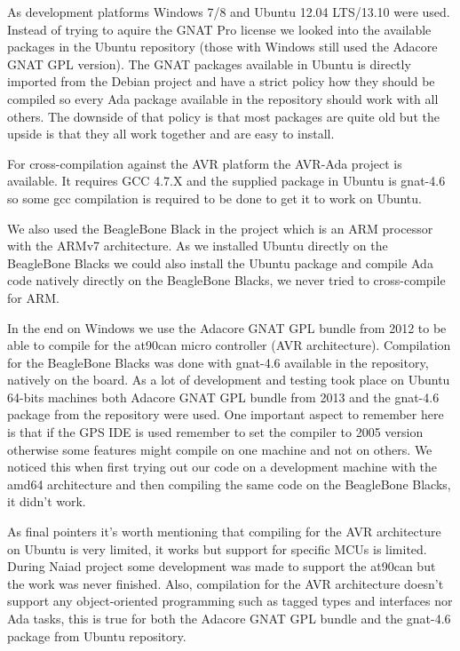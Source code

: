 As development platforms Windows 7/8 and Ubuntu 12.04 LTS/13.10 were used. Instead
of trying to aquire the GNAT Pro license we looked into the available packages
in the Ubuntu repository (those with Windows still used the Adacore GNAT GPL version).
The GNAT packages available in Ubuntu is directly imported from the Debian
project and have a strict policy \cite{web:debian_ada_policy} how they should
be compiled so every Ada package available in the repository should work with all others.
The downside of that policy is that most packages are quite old but the upside
is that they all work together and are easy to install.

For cross-compilation against the AVR platform the AVR-Ada project \cite{web:avr-ada}
is available. It requires GCC 4.7.X and the supplied package in Ubuntu is gnat-4.6 so some
gcc compilation is required to be done to get it to work on Ubuntu.

We also used the BeagleBone Black in the project which is an ARM processor with
the ARMv7 architecture. As we installed Ubuntu directly on the BeagleBone Blacks
we could also install the Ubuntu package and compile Ada code natively directly
on the BeagleBone Blacks, we never tried to cross-compile for ARM.

In the end on Windows we use the Adacore GNAT GPL bundle from 2012 to be able
to compile for the at90can micro controller (AVR architecture). Compilation for
the BeagleBone Blacks was done with gnat-4.6 available in the repository, natively
on the board. As a lot of development and testing took place on Ubuntu 64-bits
machines both Adacore GNAT GPL bundle from 2013 and the gnat-4.6 package from the
repository were used. One important aspect to remember here is that if the GPS
IDE is used remember to set the compiler to 2005 version otherwise some features
might compile on one machine and not on others. We noticed this when first trying
out our code on a development machine with the amd64 architecture and then compiling
the same code on the BeagleBone Blacks, it didn't work.

As final pointers it's worth mentioning that compiling for the AVR architecture
on Ubuntu is very limited, it works but support for specific MCUs is limited. During
Naiad project some development was made to support the at90can but the work was
never finished. Also, compilation for the AVR architecture doesn't support any
object-oriented programming such as tagged types and interfaces nor Ada tasks, this
is true for both the Adacore GNAT GPL bundle and the gnat-4.6 package from Ubuntu
repository.

